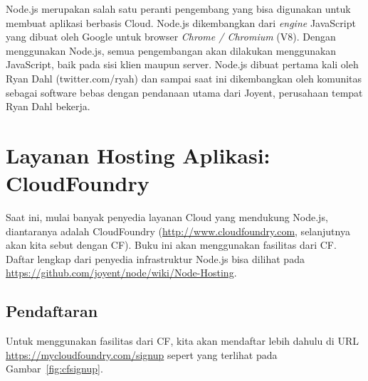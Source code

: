 Node.js merupakan salah satu peranti pengembang yang bisa digunakan untuk membuat aplikasi berbasis Cloud. Node.js dikembangkan dari \textit{engine} JavaScript yang dibuat oleh Google untuk browser \textit{Chrome / Chromium} (V8). Dengan menggunakan Node.js, semua pengembangan akan dilakukan menggunakan JavaScript, baik pada sisi klien maupun server. Node.js dibuat pertama kali oleh Ryan Dahl (twitter.com/ryah) dan sampai saat ini dikembangkan oleh komunitas sebagai software bebas dengan pendanaan utama dari Joyent, perusahaan tempat Ryan Dahl bekerja.

\section{Layanan Hosting Aplikasi: CloudFoundry}

Saat ini, mulai banyak penyedia layanan Cloud yang mendukung Node.js, diantaranya adalah CloudFoundry (\url{http://www.cloudfoundry.com}, selanjutnya akan kita sebut dengan CF). Buku ini akan menggunakan fasilitas dari CF. Daftar lengkap dari penyedia infrastruktur Node.js bisa dilihat pada \url{https://github.com/joyent/node/wiki/Node-Hosting}.

\subsection{Pendaftaran}

Untuk menggunakan fasilitas dari CF, kita akan mendaftar lebih dahulu di URL \url{https://mycloudfoundry.com/signup} sepert yang terlihat pada Gambar~\ref{fig:cfsignup}.

